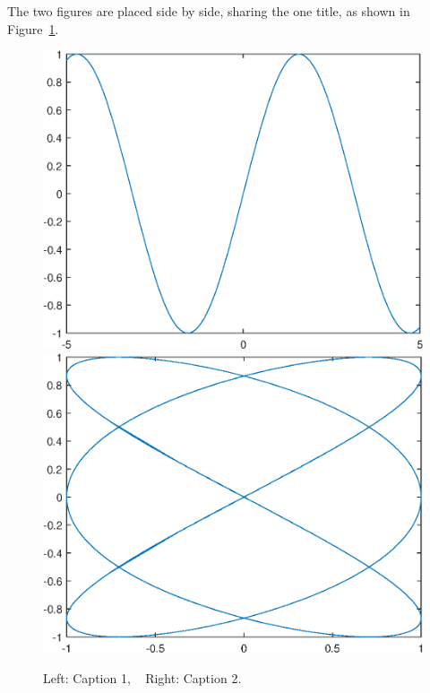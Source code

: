\documentclass[openany,twoside,12pt]{book}
\theoremstyle{plain}
\numberwithin{equation}{chapter}
\numberwithin{figure}{chapter}
\numberwithin{table}{chapter}
\begin{document}
\clearpage
The two figures are placed side by side, sharing the one title, as shown in Figure~\ref{fig:twofigs}.
\begin{figure}[htp!]
  \centering
  \includegraphics[width=0.45\linewidth]{image1}
  \hfill
  \includegraphics[width=0.45\linewidth]{image2}
  \caption{Left: Caption 1, ~ Right: Caption 2.}
  \label{fig:twofigs}
\end{figure}
\end{document}
